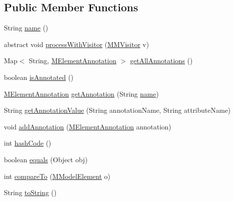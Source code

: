 \subsection*{Public Member Functions}
\begin{DoxyCompactItemize}
\item 
String \hyperlink{classorg_1_1tzi_1_1use_1_1uml_1_1mm_1_1_m_model_element_impl_ac9997b04c10d247c21c22d431d99400d}{name} ()
\item 
abstract void \hyperlink{classorg_1_1tzi_1_1use_1_1uml_1_1mm_1_1_m_model_element_impl_af313089787fae298741b655b66337ab4}{process\-With\-Visitor} (\hyperlink{interfaceorg_1_1tzi_1_1use_1_1uml_1_1mm_1_1_m_m_visitor}{M\-M\-Visitor} v)
\item 
Map$<$ String, \hyperlink{classorg_1_1tzi_1_1use_1_1uml_1_1mm_1_1_m_element_annotation}{M\-Element\-Annotation} $>$ \hyperlink{classorg_1_1tzi_1_1use_1_1uml_1_1mm_1_1_m_model_element_impl_a4dabc4cf1e645f72f10bb07a0b853d55}{get\-All\-Annotations} ()
\item 
boolean \hyperlink{classorg_1_1tzi_1_1use_1_1uml_1_1mm_1_1_m_model_element_impl_ace1ff71302c213e036e94e285a7e7e56}{is\-Annotated} ()
\item 
\hyperlink{classorg_1_1tzi_1_1use_1_1uml_1_1mm_1_1_m_element_annotation}{M\-Element\-Annotation} \hyperlink{classorg_1_1tzi_1_1use_1_1uml_1_1mm_1_1_m_model_element_impl_add5d662d11c0e9e9e24a2e8e86cbdf33}{get\-Annotation} (String \hyperlink{classorg_1_1tzi_1_1use_1_1uml_1_1mm_1_1_m_model_element_impl_ac9997b04c10d247c21c22d431d99400d}{name})
\item 
String \hyperlink{classorg_1_1tzi_1_1use_1_1uml_1_1mm_1_1_m_model_element_impl_a9e9b330dc4f81c6dff24a9aff193cf13}{get\-Annotation\-Value} (String annotation\-Name, String attribute\-Name)
\item 
void \hyperlink{classorg_1_1tzi_1_1use_1_1uml_1_1mm_1_1_m_model_element_impl_a3ac9627930b5459c759609810c7ea5ec}{add\-Annotation} (\hyperlink{classorg_1_1tzi_1_1use_1_1uml_1_1mm_1_1_m_element_annotation}{M\-Element\-Annotation} annotation)
\item 
int \hyperlink{classorg_1_1tzi_1_1use_1_1uml_1_1mm_1_1_m_model_element_impl_a3d0dc8ebe4ad624e07a979c3db32fce2}{hash\-Code} ()
\item 
boolean \hyperlink{classorg_1_1tzi_1_1use_1_1uml_1_1mm_1_1_m_model_element_impl_a10a72c60c40f1f725e6f8a35853d08f2}{equals} (Object obj)
\item 
int \hyperlink{classorg_1_1tzi_1_1use_1_1uml_1_1mm_1_1_m_model_element_impl_a6d774f95bb85ea72a694ae2a3edcce9a}{compare\-To} (\hyperlink{interfaceorg_1_1tzi_1_1use_1_1uml_1_1mm_1_1_m_model_element}{M\-Model\-Element} o)
\item 
String \hyperlink{classorg_1_1tzi_1_1use_1_1uml_1_1mm_1_1_m_model_element_impl_aa81e8ee87fff00cba70c01a67121e7e1}{to\-String} ()
\end{DoxyCompactItemize}
